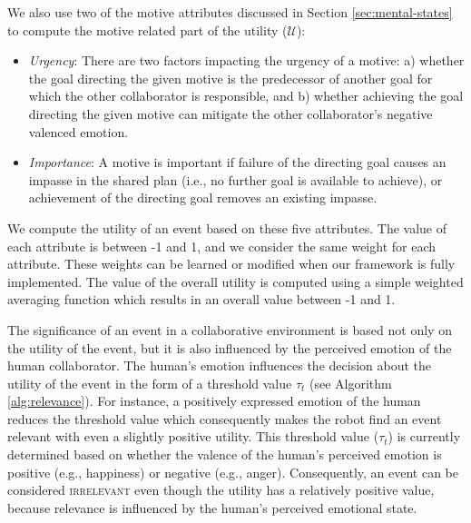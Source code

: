 \documentclass{article}
\begin{document}
\noindent We also use two of the motive attributes discussed in Section
\ref{sec:mental-states} to compute the motive related part of the utility
($\mathcal{U}$):

\begin{itemize}[leftmargin=2pt]
  \setlength\itemsep{1mm}
  \item \textit{Urgency}: There are two factors impacting the urgency of
  a motive: a) whether the goal directing the given motive is the predecessor of
  another goal for which the other collaborator is responsible, and b) whether
  achieving the goal directing the given motive can mitigate the other
  collaborator's negative valenced emotion.
  \item \textit{Importance}: A motive is important if failure of the directing
  goal causes an impasse in the shared plan (i.e., no further goal is available
  to achieve), or achievement of the directing goal removes an existing impasse.
\end{itemize}

We compute the utility of an event based on these five attributes. The value of
each attribute is between -1 and 1, and we consider the same weight for each
attribute. These weights can be learned or modified when our framework is fully
implemented. The value of the overall utility is computed using a simple
weighted averaging function which results in an overall value between -1 and 1.

The significance of an event in a collaborative environment is based not
only on the utility of the event, but it is also influenced by the perceived
emotion of the human collaborator. The human's emotion influences the decision
about the utility of the event in the form of a threshold value $\tau_{t}$ (see
Algorithm \ref{alg:relevance}). For instance, a positively expressed emotion of
the human reduces the threshold value which consequently makes the robot find an
event relevant with even a slightly positive utility. This threshold value
($\tau_{t}$) is currently determined based on whether the valence of the
human's perceived emotion is positive (e.g., happiness) or negative (e.g.,
anger). Consequently, an event can be considered \textsc{irrelevant} even though
the utility has a relatively positive value, because relevance is influenced by
the human's perceived emotional state.
\end{document}
